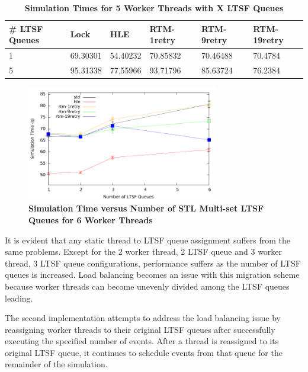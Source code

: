 \documentclass[11pt]{book}
\begin{document}
\begin{table}
    \centering
    \begin{tabular}{l|p{2cm}|p{2cm}|p{2cm}|p{2cm}|p{2cm}}
        \textbf{\# LTSF Queues}&Lock &HLE &RTM-1retry &RTM-9retry &RTM-19retry \\
        \hline
        \midrule
            1 &69.30301  &54.40232 &70.85832  &70.46488 &70.4784 \\ 
            5 &95.31338  &77.55966 &93.71796  &85.63724 &76.2384 \\
    \end{tabular}
    \caption{\textbf{Simulation Times for 5 Worker Threads with X LTSF
        Queues}}\label{tab:xThrMig_5threadsXschq}
\end{table}

\begin{figure}
    \centering
    \graphicspath{ {./figures/} }
    \includegraphics[width=0.75\textwidth,keepaspectratio]{hugeepidemicsim-XEVENTmig-timeVSschedQs-multiset-6thread}
    \caption{\textbf{Simulation Time versus Number of STL Multi-set LTSF Queues for 6
        Worker Threads}}\label{fig:xThrMig_timeVSschq_6threads}
\end{figure}

It is evident that any static thread to LTSF queue assignment suffers from the
same problems.  Except for the 2 worker thread, 2 LTSF queue and 3 worker
thread, 3 LTSF queue configurations, performance suffers as the number of LTSF
queues is increased.  Load balancing becomes an issue with this migration scheme
because worker threads can become unevenly divided among the LTSF queues
leading.

The second implementation attempts to address the load balancing issue by
reassigning worker threads to their original LTSF queues after successfully
executing the specified number of events.  After a thread is reassigned to its
original LTSF queue, it continues to schedule events from that queue for the
remainder of the simulation. 
\end{document}
